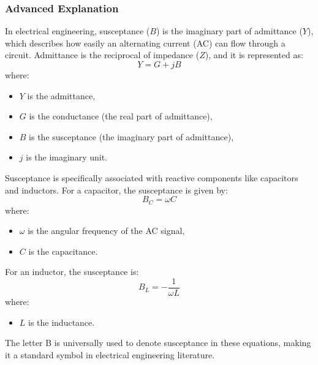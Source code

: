 \subsubsection*{Advanced Explanation}
In electrical engineering, susceptance (\(B\)) is the imaginary part of admittance (\(Y\)), which describes how easily an alternating current (AC) can flow through a circuit. Admittance is the reciprocal of impedance (\(Z\)), and it is represented as:
\[
Y = G + jB
\]
where:
\begin{itemize}
    \item \(Y\) is the admittance,
    \item \(G\) is the conductance (the real part of admittance),
    \item \(B\) is the susceptance (the imaginary part of admittance),
    \item \(j\) is the imaginary unit.
\end{itemize}
Susceptance is specifically associated with reactive components like capacitors and inductors. For a capacitor, the susceptance is given by:
\[
B_C = \omega C
\]
where:
\begin{itemize}
    \item \(\omega\) is the angular frequency of the AC signal,
    \item \(C\) is the capacitance.
\end{itemize}
For an inductor, the susceptance is:
\[
B_L = -\frac{1}{\omega L}
\]
where:
\begin{itemize}
    \item \(L\) is the inductance.
\end{itemize}
The letter B is universally used to denote susceptance in these equations, making it a standard symbol in electrical engineering literature.

